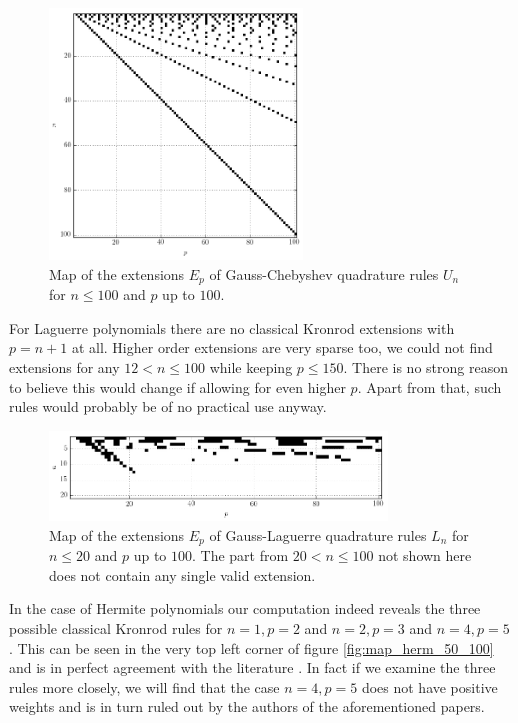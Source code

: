 \documentclass[a4paper,10pt]{article}
\begin{document}
\begin{figure}
  \centering
  \includegraphics[width=0.6\textwidth]{./img/map_chebu_100_100.png}
  \caption{Map of the extensions $E_p$ of Gauss-Chebyshev quadrature rules
           $U_n$ for $n \leq 100$ and $p$ up to $100$.}
  \label{fig:map_chebu_100_100}
\end{figure}

For Laguerre polynomials there are no classical Kronrod extensions with $p = n+1$
at all. Higher order extensions are very sparse too, we could not find extensions
for any $12 < n \leq 100$ while keeping $p \leq 150$. There is no strong reason to
believe this would change if allowing for even higher $p$. Apart from that, such
rules would probably be of no practical use anyway.

\begin{figure}
  \centering
  \includegraphics[width=0.8\textwidth]{./img/map_lag_20_100.png}
  \caption{Map of the extensions $E_p$ of Gauss-Laguerre quadrature rules
           $L_n$ for $n \leq 20$ and $p$ up to $100$. The part from
           $20 < n \leq 100$ not shown here does not contain any single
           valid extension.}
  \label{fig:map_lag_20_100}
\end{figure}

In the case of Hermite polynomials our computation indeed reveals the three possible
classical Kronrod rules for $n=1, p=2$ and $n = 2, p = 3$ and $n = 4, p = 5$. This
can be seen in the very top left corner of figure \ref{fig:map_herm_50_100} and is
in perfect agreement with the literature \cite{monegato1976, kahaner-monegato, vladislav}.
In fact if we examine the three rules more closely, we will find that the case
$n = 4, p = 5$ does not have positive weights and is in turn ruled out by the
authors of the aforementioned papers.
\end{document}
